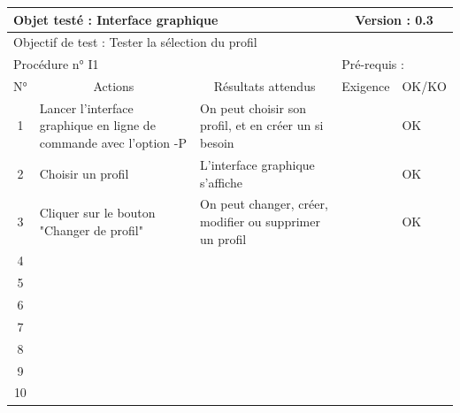 \documentclass{../res/univ-projet}
\begin{document}
\begin{center}
    \begin{tabular}{|c|p{5cm}|p{5cm}|p{1.5cm}|p{1.5cm}|}
      \hline
      \multicolumn{3}{|l|}{Objet testé : Interface graphique} & \multicolumn{2}{c|}{Version : 0.3}\\ \hline
      \multicolumn{5}{|l|}{Objectif de test : Tester la sélection du profil}\\ \hline
      \multicolumn{3}{|l|}{Procédure n° I1} & \multicolumn{2}{p{3cm}|}{Pré-requis : }\\ \hline
      \multicolumn{1}{|c|}{N°} & \multicolumn{1}{c|}{Actions} & \multicolumn{1}{c|}{Résultats attendus} & 
      \multicolumn{1}{c|}{Exigence} & \multicolumn{1}{c|}{OK/KO}\\ \hline
      1 & Lancer l'interface graphique en ligne de commande avec l'option -P & On peut choisir son profil, et en créer un si besoin &  & OK \\
      2 & Choisir un profil & L'interface graphique s'affiche &  & OK \\
      3 & Cliquer sur le bouton "Changer de profil" & On peut changer, créer, modifier ou supprimer un profil &  & OK \\ 
    4 &  &  &  & \\
      5 &  &  &  & \\
    6 &  &  &  & \\
      7 &  &  &  & \\
      8 &  &  &  & \\
      9 &  &  &  & \\
      10 &  &  &  &\\ 
  \hline
    \end{tabular}
    \vskip 2.2cm


\end{center}
\end{document}
